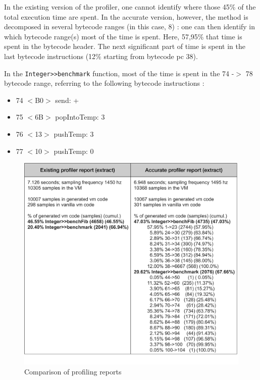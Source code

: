 \documentclass[10pt,preprint,nonatbib]{sigplanconf}
\newcommand{\ct}{\lstinline[backgroundcolor=\color{white},basicstyle=\small\ttfamily]}
\newcommand{\figlabel}[1]{\label{fig:#1}}
\begin{document}
In the existing version of the profiler, one cannot identify where those 45\% of the total execution time are spent. In the accurate version, however, the method is decomposed in several bytecode ranges (in this case, 8) : one can then identify in which bytecode range(s) most of the time is spent. Here, 57,95\% that time is spent in the bytecode header. The next significant part of time is spent in the last bytecode instructions (12\% starting from bytecode pc 38).

In the \ct{Integer>>benchmark} function, most of the time is spent in the 74 -$>$ 78 bytecode range, referring to the following bytecode instructions : 
\begin{itemize}
	\item 74 $<$B0$>$ send: +
	\item 75 $<$6B$>$ popIntoTemp: 3
	\item 76 $<$13$>$ pushTemp: 3
	\item 77 $<$10$>$ pushTemp: 0
\end{itemize}

  \begin{figure}[!htp]
     \begin{center}
         \includegraphics[width=1.055\linewidth]{ReportComparison}
         \caption{Comparison of profiling reports}
         \figlabel{fig:ReportComparison}
     \end{center}
 \end{figure}
\end{document}
